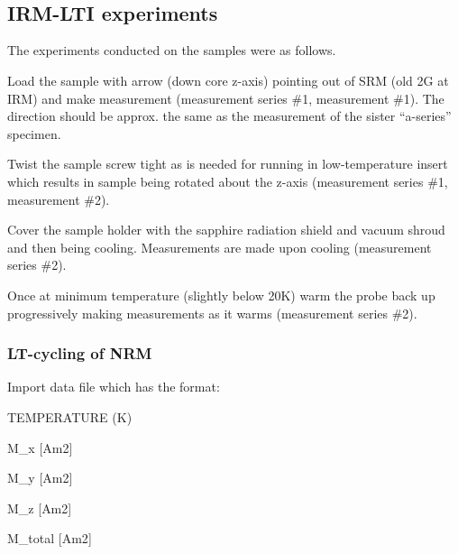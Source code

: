 \documentclass{article}
\begin{document}
    \begin{center}
    \end{center}
    { \hspace*{\fill} \\}
    
    \begin{center}
    \end{center}
    { \hspace*{\fill} \\}
    

    \subsection{IRM-LTI experiments}


    The experiments conducted on the samples were as follows.

Load the sample with arrow (down core z-axis) pointing out of SRM (old
2G at IRM) and make measurement (measurement series \#1, measurement
\#1). The direction should be approx. the same as the measurement of the
sister ``a-series'' specimen.

Twist the sample screw tight as is needed for running in low-temperature
insert which results in sample being rotated about the z-axis
(measurement series \#1, measurement \#2).

Cover the sample holder with the sapphire radiation shield and vacuum
shroud and then being cooling. Measurements are made upon cooling
(measurement series \#2).

Once at minimum temperature (slightly below 20K) warm the probe back up
progressively making measurements as it warms (measurement series \#2).


    \subsubsection{LT-cycling of NRM}


    Import data file which has the format:

TEMPERATURE (K)

M\_x {[}Am2{]}

M\_y {[}Am2{]}

M\_z {[}Am2{]}

M\_total {[}Am2{]}
\end{document}
